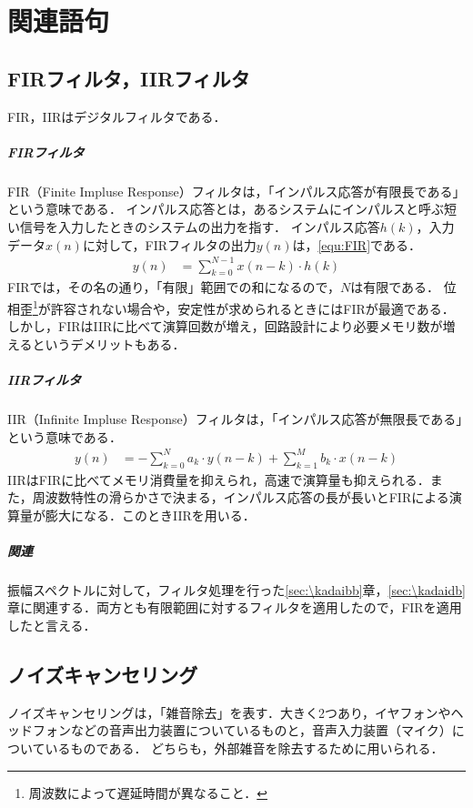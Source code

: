 \chapter{関連語句}
\section{FIRフィルタ，IIRフィルタ}
FIR，IIRはデジタルフィルタである．
\paragraph{FIRフィルタ}
FIR（Finite Impluse Response）フィルタは，「インパルス応答が有限長である」という意味である\cite[p.92]{音声音響インタフェース実践}．
インパルス応答とは，あるシステムにインパルスと呼ぶ短い信号を入力したときのシステムの出力を指す．
インパルス応答\(h(k)\)，入力データ\(x(n)\)に対して，FIRフィルタの出力\(y(n)\)は，\eqref{equ:FIR}である．
\begin{align}
    y(n) & =\sum_{k=0}^{N-1}x(n-k)\cdot h(k)\label{equ:FIR}
\end{align}
FIRでは，その名の通り，「有限」範囲での和になるので，\(N\)は有限である．
位相歪\footnote{周波数によって遅延時間が異なること．}が許容されない場合や，安定性が求められるときにはFIRが最適である．
しかし，FIRはIIRに比べて演算回数が増え，回路設計により必要メモリ数が増えるというデメリットもある．
\paragraph{IIRフィルタ}
IIR（Infinite Impluse Response）フィルタは，「インパルス応答が無限長である」という意味である\cite[p.92]{音声音響インタフェース実践}．
\begin{align}
    y(n) & =-\sum_{k=0}^{N}a_k\cdot y(n-k)+\sum_{k=1}^{M}b_k\cdot x(n-k)\label{equ:IIR}
\end{align}
IIRはFIRに比べてメモリ消費量を抑えられ，高速で演算量も抑えられる．また，周波数特性の滑らかさで決まる，インパルス応答の長が長いとFIRによる演算量が膨大になる．このときIIRを用いる．
\paragraph{関連}
振幅スペクトルに対して，フィルタ処理を行った\ref{sec:\kadaibb}章，\ref{sec:\kadaidb}章に関連する．両方とも有限範囲に対するフィルタを適用したので，FIRを適用したと言える．
\section{ノイズキャンセリング}
ノイズキャンセリングは，「雑音除去」を表す．大きく2つあり，イヤフォンやヘッドフォンなどの音声出力装置についているものと，音声入力装置（マイク）についているものである．
どちらも，外部雑音を除去するために用いられる．\par
